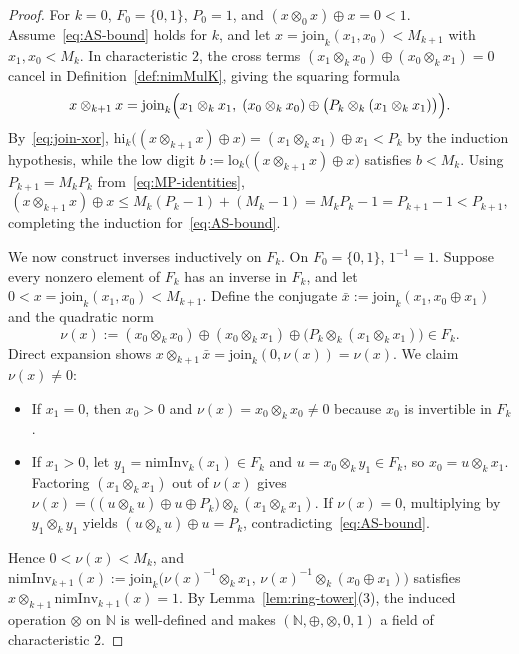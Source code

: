 \documentclass[11pt]{article}
\theoremstyle{definition}
\theoremstyle{remark}
\newcommand{\nimadd}{\oplus}
\newcommand{\nimmul}{\otimes}
\newcommand{\N}{\mathbb{N}}
\begin{document}
\begin{proof}
For $k = 0$, $F_0 = \{0,1\}$, $P_0 = 1$, and $(x \nimmul_0 x) \nimadd x = 0 < 1$. Assume~\eqref{eq:AS-bound} holds for $k$, and let $x = \mathrm{join}_k(x_1, x_0) < M_{k+1}$ with $x_1, x_0 < M_k$. In characteristic $2$, the cross terms $(x_1 \nimmul_k x_0) \nimadd (x_0 \nimmul_k x_1) = 0$ cancel in Definition~\ref{def:nimMulK}, giving the squaring formula
\begin{equation}\label{eq:sq-recurrence}
  x \nimmul_{k+1} x = \mathrm{join}_k\Bigl(x_1 \nimmul_k x_1,\; (x_0 \nimmul_k x_0) \nimadd \bigl(P_k \nimmul_k (x_1 \nimmul_k x_1)\bigr)\Bigr).
\end{equation}
By~\eqref{eq:join-xor}, $\mathrm{hi}_k\bigl((x \nimmul_{k+1} x) \nimadd x\bigr) = (x_1 \nimmul_k x_1) \nimadd x_1 < P_k$ by the induction hypothesis, while the low digit $b := \mathrm{lo}_k\bigl((x \nimmul_{k+1} x) \nimadd x\bigr)$ satisfies $b < M_k$. Using $P_{k+1} = M_k P_k$ from~\eqref{eq:MP-identities},
\[
  (x \nimmul_{k+1} x) \nimadd x \le M_k(P_k - 1) + (M_k - 1) = M_k P_k - 1 = P_{k+1} - 1 < P_{k+1},
\]
completing the induction for~\eqref{eq:AS-bound}.

We now construct inverses inductively on $F_k$. On $F_0 = \{0,1\}$, $1^{-1} = 1$. Suppose every nonzero element of $F_k$ has an inverse in $F_k$, and let $0 < x = \mathrm{join}_k(x_1, x_0) < M_{k+1}$. Define the conjugate $\bar{x} := \mathrm{join}_k(x_1, x_0 \nimadd x_1)$ and the quadratic norm
\[
  \nu(x) := (x_0 \nimmul_k x_0) \nimadd (x_0 \nimmul_k x_1) \nimadd \bigl(P_k \nimmul_k (x_1 \nimmul_k x_1)\bigr) \in F_k.
\]
Direct expansion shows $x \nimmul_{k+1} \bar{x} = \mathrm{join}_k(0, \nu(x)) = \nu(x)$. We claim $\nu(x) \neq 0$:
\begin{itemize}
  \item If $x_1 = 0$, then $x_0 > 0$ and $\nu(x) = x_0 \nimmul_k x_0 \neq 0$ because $x_0$ is invertible in $F_k$.
  \item If $x_1 > 0$, let $y_1 = \mathrm{nimInv}_k(x_1) \in F_k$ and $u = x_0 \nimmul_k y_1 \in F_k$, so $x_0 = u \nimmul_k x_1$. Factoring $(x_1 \nimmul_k x_1)$ out of $\nu(x)$ gives $\nu(x) = \bigl((u \nimmul_k u) \nimadd u \nimadd P_k\bigr) \nimmul_k (x_1 \nimmul_k x_1)$. If $\nu(x) = 0$, multiplying by $y_1 \nimmul_k y_1$ yields $(u \nimmul_k u) \nimadd u = P_k$, contradicting~\eqref{eq:AS-bound}.
\end{itemize}
Hence $0 < \nu(x) < M_k$, and $\mathrm{nimInv}_{k+1}(x) := \mathrm{join}_k\bigl(\nu(x)^{-1} \nimmul_k x_1,\, \nu(x)^{-1} \nimmul_k (x_0 \nimadd x_1)\bigr)$ satisfies $x \nimmul_{k+1} \mathrm{nimInv}_{k+1}(x) = 1$. By Lemma~\ref{lem:ring-tower}(3), the induced operation $\nimmul$ on $\N$ is well-defined and makes $(\N, \nimadd, \nimmul, 0, 1)$ a field of characteristic $2$.
\end{proof}
\end{document}
